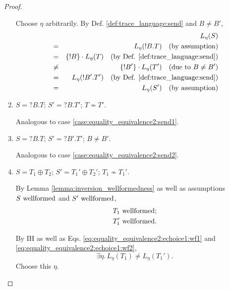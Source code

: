 \documentclass{llncs}
\newcommand*{\nsequiv}{\not\sim}
\newcommand*{\send}{\mathord{!}}
\newcommand*{\recv}{\mathord{?}}
\newcommand*{\echoice}{\oplus}
\newcommand*{\concat}{\cdot}
\newcommand*{\wf}[1]{\text{$#1$ {\normalfont \rmfamily wellformed}}}
\renewcommand*{\|}{\;|\;}
\begin{document}
\begin{proof}
\begin{enumerate}
      Choose $\eta$ arbitrarily.
      By Def. \ref{def:trace_language:send} and $B \neq B'$,
      \begin{eqnarray*}
        &&     L_\eta(S) \\
        &=&    L_\eta(\send B.T)
               \quad \text{(by assumption)} \\
        &=&    \{\send B\} \concat L_\eta(T)
               \quad \text{(by Def. \ref{def:trace_language:send})} \\
        &\neq& \{\send B'\} \concat L_\eta(T')
               \quad \text{(due to $B \neq B'$)} \\
        &=&    L_\eta(\send B'.T')
               \quad \text{(by Def. \ref{def:trace_language:send})} \\
        &=&    L_\eta(S')
               \quad \text{(by assumption)}
      \end{eqnarray*}

    \item
      \label{case:equality_equivalence2:recv1}
      $S = \recv B.T$; $S' = \recv B.T'$; $T \nsequiv T'$.

      Analogous to case \ref{case:equality_equivalence2:send1}.

    \item
      \label{case:equality_equivalence2:recv2}
      $S = \recv B.T$; $S' = \recv B'.T'$; $B \neq B'$.

      Analogous to case \ref{case:equality_equivalence2:send2}.

    \item
      \label{case:equality_equivalence2:echoice1}
      $S = T_1 \echoice T_2$; $S' = T_1' \echoice T_2'$; $T_1 \nsequiv T_1'$.

      By Lemma \ref{lemma:inversion_wellformedness} as well as assumptions
      $\wf{S}$ and $\wf{S'}$,
      \begin{eqnarray}
        \label{eq:equality_equivalence2:echoice1:wf1}
        \wf{T_1}; \\
        \label{eq:equality_equivalence2:echoice1:wf2}
        \wf{T_1'}. \\
      \end{eqnarray}

      By IH as well as Eqs. \ref{eq:equality_equivalence2:echoice1:wf1} and
      \ref{eq:equality_equivalence2:echoice1:wf2},
      \begin{equation}
        \label{eq:equality_equivalence2:echoice1:neq}
        \exists \eta.\, L_\eta(T_1) \neq L_\eta(T_1').
      \end{equation}
      Choose this $\eta$.


\end{enumerate}
\end{proof}
\end{document}
